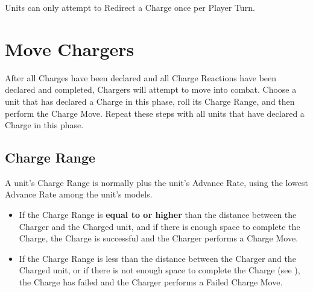 Units can only attempt to Redirect a Charge once per Player Turn.

\section{Move Chargers}
\label{move_chargers}

After all Charges have been declared and all Charge Reactions have been declared and completed, Chargers will attempt to move into combat. Choose a unit that has declared a Charge in this phase, roll its Charge Range, and then perform the Charge Move. Repeat these steps with all units that have declared a Charge in this phase.

\subsection{Charge Range}

A unit's Charge Range is normally  plus the unit's Advance Rate, using the lowest Advance Rate among the unit's models.

\begin{itemize}
	\item If the Charge Range is \textbf{equal to or higher} than the distance between the Charger and the Charged unit, and if there is enough space to complete the Charge, the Charge is successful and the Charger performs a Charge Move.
	\item If the Charge Range is less than the distance between the Charger and the Charged unit, or if there is not enough space to complete the Charge (see ), the Charge has failed and the Charger performs a Failed Charge Move.
\end{itemize}

\newcommand{\alignA}{a)}
\newcommand{\alignB}{b)}
\newcommand{\alignC}{c)}
\newcommand{\alignD}{d)}
\newcommand{\alignE}{e)}
\newcommand{\alignCharge}{\smallfontsize{\flufffont{Charge!}}}
\newcommand{\alignFlyingCharge}{\smallfontsize{\flufffont{Flying Charge!}}}

